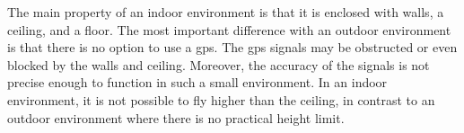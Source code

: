 The main property of an indoor environment is that it is enclosed with walls, a ceiling, and a floor. The most important difference with an outdoor environment is that there is no option to use a \acs{gps}. The \acs{gps} signals may be obstructed or even blocked by the walls and ceiling. Moreover, the accuracy of the signals is not precise enough to function in such a small environment. In an indoor environment, it is not possible to fly higher than the ceiling, in contrast to an outdoor environment where there is no practical height limit.